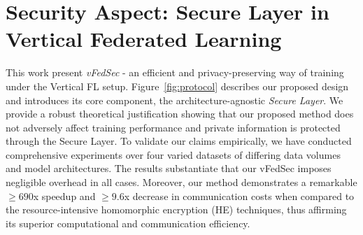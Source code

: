 \documentclass[withindex,glossary,firstyr]{cam-thesis}
\begin{document}
\section{Security Aspect: Secure Layer in Vertical Federated Learning}



This work present \emph{vFedSec} - an efficient and privacy-preserving way of training under the Vertical FL setup. %
Figure~\ref{fig:protocol} describes our proposed design and introduces its core component, the architecture-agnostic \emph{Secure Layer}.
We provide a robust theoretical justification showing that our proposed method does not adversely affect training performance and private information is protected through the Secure Layer. To validate our claims empirically, we have conducted comprehensive experiments over four varied datasets of differing data volumes and model architectures. The results substantiate that our vFedSec imposes negligible overhead in all cases. Moreover, our method demonstrates a remarkable $\geq 690$x speedup and $\geq 9.6$x decrease in communication costs when compared to the resource-intensive homomorphic encryption (HE) techniques, thus affirming its superior computational and communication efficiency. %
\end{document}
